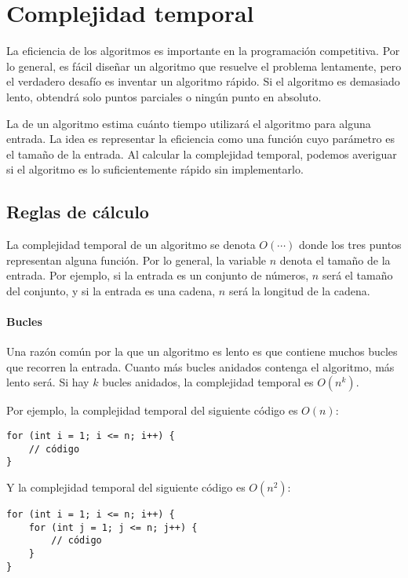 \chapter{Complejidad temporal}


La eficiencia de los algoritmos es importante en la programación competitiva.
Por lo general, es fácil diseñar un algoritmo
que resuelve el problema lentamente,
pero el verdadero desafío es inventar un
algoritmo rápido.
Si el algoritmo es demasiado lento, obtendrá solo
puntos parciales o ningún punto en absoluto.

La  de un algoritmo
estima cuánto tiempo utilizará el algoritmo
para alguna entrada.
La idea es representar la eficiencia
como una función cuyo parámetro es el tamaño de la entrada.
Al calcular la complejidad temporal,
podemos averiguar si el algoritmo es lo suficientemente rápido
sin implementarlo.

\section{Reglas de cálculo}

La complejidad temporal de un algoritmo
se denota $O(\cdots)$
donde los tres puntos representan alguna
función.
Por lo general, la variable $n$ denota
el tamaño de la entrada.
Por ejemplo, si la entrada es un conjunto de números,
$n$ será el tamaño del conjunto,
y si la entrada es una cadena,
$n$ será la longitud de la cadena.

\subsubsection*{Bucles}

Una razón común por la que un algoritmo es lento es
que contiene muchos bucles que recorren la entrada.
Cuanto más bucles anidados contenga el algoritmo,
más lento será.
Si hay $k$ bucles anidados,
la complejidad temporal es $O(n^k)$.

Por ejemplo, la complejidad temporal del siguiente código es $O(n)$:
\begin{lstlisting}
for (int i = 1; i <= n; i++) {
    // código
}
\end{lstlisting}

Y la complejidad temporal del siguiente código es $O(n^2)$:
\begin{lstlisting}
for (int i = 1; i <= n; i++) {
    for (int j = 1; j <= n; j++) {
        // código
    }
}
\end{lstlisting}

